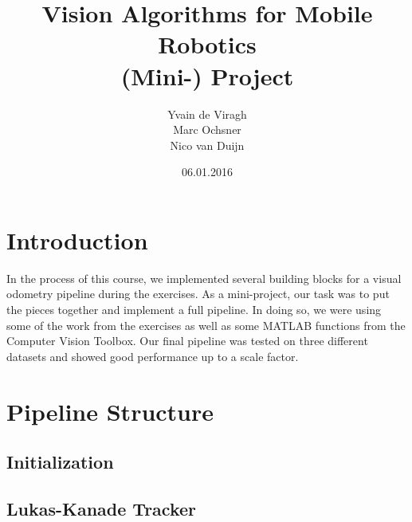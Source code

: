 \documentclass[11pt]{article}
\title{Vision Algorithms for Mobile Robotics\\ (Mini-) Project}
\author{Yvain de Viragh\\Marc Ochsner\\Nico van Duijn}
\date{06.01.2016}
\begin{document}
\maketitle
{}


\section{Introduction}
In the process of this course, we implemented several building blocks for a visual odometry pipeline during the exercises. As a mini-project, our task was to put the pieces together and implement a full pipeline. In doing so, we were using some of the work from the exercises as well as some MATLAB functions from the Computer Vision Toolbox. Our final pipeline was tested on three different datasets and showed good performance up to a scale factor.


\section{Pipeline Structure}
\subsection{Initialization}

\subsection{Lukas-Kanade Tracker}
\end{document}
